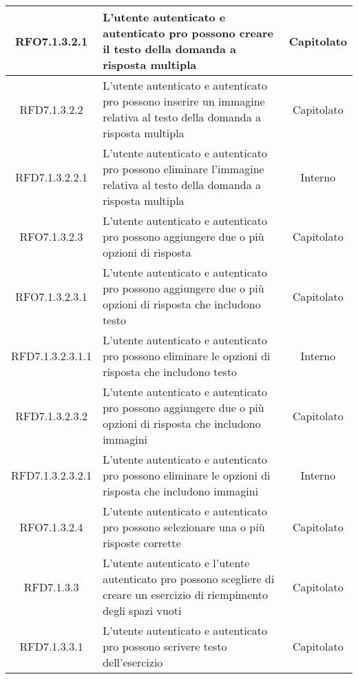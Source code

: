 \begin{longtable}{|c|>{\centering}m{7cm}|c|}
\hypertarget{RFO7.1.3.2.1}{RFO7.1.3.2.1} & L’utente autenticato e autenticato pro possono creare il testo della domanda a risposta multipla  & Capitolato
\\ \hline

\hypertarget{RFD7.1.3.2.2}{RFD7.1.3.2.2} & L’utente autenticato e autenticato pro possono inserire un immagine relativa al testo della domanda a risposta multipla  & Capitolato
\\ \hline

\hypertarget{RFD7.1.3.2.2.1}{RFD7.1.3.2.2.1} & L’utente autenticato e autenticato pro possono eliminare l’immagine relativa al testo della domanda a risposta multipla & Interno
\\ \hline

\hypertarget{RFO7.1.3.2.3}{RFO7.1.3.2.3} & L’utente autenticato e autenticato pro possono aggiungere due o più opzioni di risposta & Capitolato
\\ \hline

\hypertarget{RFO7.1.3.2.3.1}{RFO7.1.3.2.3.1} & L’utente autenticato e autenticato pro possono aggiungere due o più opzioni di risposta che includono testo & Capitolato
\\ \hline

\hypertarget{RFD7.1.3.2.3.1.1}{RFD7.1.3.2.3.1.1} & L’utente autenticato e autenticato pro possono eliminare   le opzioni di risposta che includono testo & Interno
\\ \hline

\hypertarget{RFD7.1.3.2.3.2}{RFD7.1.3.2.3.2} & L’utente autenticato e autenticato pro possono aggiungere due o più opzioni di risposta che includono immagini & Capitolato
\\ \hline

\hypertarget{RFD7.1.3.2.3.2.1}{RFD7.1.3.2.3.2.1} & L’utente autenticato e autenticato pro possono eliminare   le opzioni di risposta che includono immagini  & Interno
\\ \hline

\hypertarget{RFO7.1.3.2.4}{RFO7.1.3.2.4} & L’utente autenticato e autenticato pro possono selezionare una o più risposte corrette & Capitolato
\\ \hline

\hypertarget{RFD7.1.3.3}{RFD7.1.3.3} & L’utente autenticato e l’utente autenticato pro possono scegliere di creare un esercizio di riempimento degli spazi vuoti  & Capitolato
\\ \hline

\hypertarget{RFD7.1.3.3.1}{RFD7.1.3.3.1} & L’utente autenticato e autenticato pro possono scrivere testo dell’esercizio & Capitolato
\\ \hline


\end{longtable}
